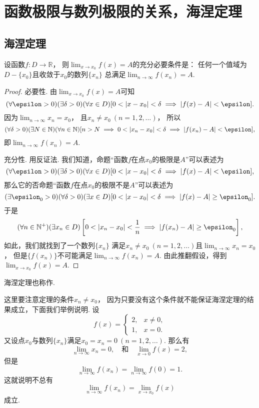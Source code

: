 \section{函数极限与数列极限的关系，海涅定理}
\subsection{海涅定理}
\begin{theorem}[海涅定理]\label{theorem:极限.海涅定理}
设函数\(f\colon D\to\mathbb{R}\)，
则\(\lim_{x \to x_0} f(x) = A\)的充分必要条件是：
任何一个值域为\(D-\{x_0\}\)且收敛于\(x_0\)的数列\(\{x_n\}\)
总满足\(\lim_{n\to\infty} f(x_n) = A\).
\begin{proof}
必要性.
由\(\lim_{x \to x_0} f(x) = A\)可知\[
	(\forall\epsilon>0)
	(\exists\delta>0)
	(\forall x\in D)
	[
		0<\abs{x-x_0}<\delta
		\implies
		\abs{f(x)-A}<\epsilon
	].
\]
因为\(\lim_{n\to\infty} x_n = x_0\)，
且\(x_n \neq x_0\ (n=1,2,\dotsc)\)，
所以\[
	(\forall\delta>0)
	(\exists N\in\mathbb{N})
	(\forall n\in\mathbb{N})
	[
		n>N
		\implies
		0<\abs{x_n-x_0}<\delta
		\implies
		\abs{f(x_n)-A}<\epsilon
	],
\]
即\(\lim_{n\to\infty} f(x_n) = A\).

充分性.
用反证法.
我们知道，命题“函数\(f\)在点\(x_0\)的极限是\(A\)”可以表述为\[
	(\forall\epsilon>0)
	(\exists\delta>0)
	(\forall x\in D)
	[
		0<\abs{x-x_0}<\delta
		\implies
		\abs{f(x)-A}<\epsilon
	],
\]
那么它的否命题“函数\(f\)在点\(x_0\)的极限不是\(A\)”可以表述为\[
	(\exists\epsilon_0>0)
	(\forall\delta>0)
	(\exists x\in D)
	[
		0<\abs{x-x_0}<\delta
		\implies
		\abs{f(x)-A}\geq\epsilon_0
	].
\]
于是\[
	(\forall n\in\mathbb{N}^+)
	(\exists x_n\in D)
	\left[
		0<\abs{x_n-x_0}<\frac1n
		\implies
		\abs{f(x_n)-A}\geq\epsilon_0
	\right],
\]
如此，我们就找到了一个数列\(\{x_n\}\)
满足\(x_n\neq x_0\ (n=1,2,\dotsc)\)且\(\lim_{n\to\infty} x_n = x_0\)，
但是\(\{f(x_n)\}\)不可能满足\(\lim_{n\to\infty} f(x_n) = A\).
由此推翻假设，得到\(\lim_{x\to x_0} f(x) = A\).
\end{proof}
\end{theorem}
海涅定理也称作.

这里要注意定理的条件\(x_n \neq x_0\)，
因为只要没有这个条件就不能保证海涅定理的结果成立，下面我们举例说明.
设\[
	f(x) = \left\{ \begin{array}{cl}
		2, & x\neq0, \\
		1, & x=0.
	\end{array} \right.
\]
又设点\(x_0\)与数列\(\{x_n\}\)满足\(x_0=x_n=0\ (n=1,2,\dotsc)\).
那么有\[
	\lim_{n\to\infty} x_n = 0,
	\quad\text{和}\quad
	\lim_{x\to0} f(x) = 2,
\]
但是\[
	\lim_{n\to\infty} f(x_n) = \lim_{n\to\infty} f(0) = 1.
\]这就说明不总有\[
	\lim_{n\to\infty} f(x_n)
	= \lim_{x \to x_0} f(x)
\]成立.


